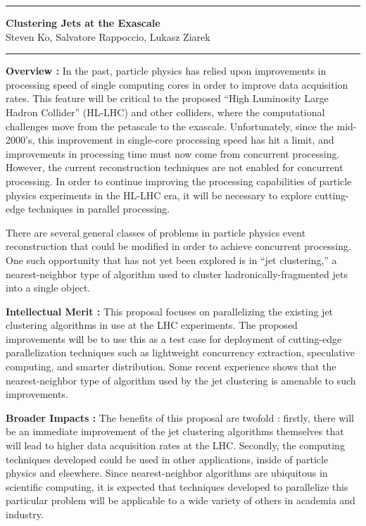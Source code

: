 \documentclass[times,11pt]{article}
\begin{document}
\hrule
\begin{center}
{\bf \Large Clustering Jets at the Exascale}\\
Steven Ko, Salvatore Rappoccio, Lukasz Ziarek
\end{center}
\hrule
\bigskip


{\bf Overview :}
In the past, particle physics has relied upon 
improvements in processing speed of single computing cores
in order to improve data acquisition rates. This feature will be
critical to the proposed ``High Luminosity Large Hadron Collider''
(HL-LHC) and other colliders, where the computational challenges move
from the petascale to the exascale. Unfortunately, since the mid-2000's,
this improvement
in single-core processing speed has hit a limit, and
improvements in processing time must now come from concurrent
processing. However, the current reconstruction techniques are not
enabled for concurrent processing. In order to continue
improving the processing
capabilities of particle physics experiments in the HL-LHC era, it will
be necessary to explore cutting-edge techniques in parallel processing. 

There are several general classes of problems in particle physics
event reconstruction that could be modified in order to
achieve concurrent processing. One such opportunity that has not yet
been explored is in ``jet clustering,'' a nearest-neighbor type of
algorithm used to cluster hadronically-fragmented jets into a single
object. 

\bigskip
{\bf Intellectual Merit :}
This proposal focuses on parallelizing the existing jet clustering
algorithms in use at the LHC experiments. The proposed improvements
will be to use this as a test case for deployment of cutting-edge
parallelization techniques such as lightweight concurrency extraction,
speculative computing, and smarter distribution. Some recent
experience shows that the nearest-neighbor type of algorithm used by
the jet clustering is amenable to such improvements. 

\bigskip
{\bf Broader Impacts :}
The benefits of this proposal are twofold : firstly, there will be an
immediate improvement of the jet clustering algorithms themselves that
will lead to higher data acquisition rates at the LHC. Secondly, the
computing techniques developed could be used in other applications,
inside of particle physics and elsewhere. Since nearest-neighbor
algorithms are ubiquitous in scientific computing, it is expected
that techniques developed to parallelize this particular problem
will be applicable to a wide variety of others in academia and
industry. 
\end{document}
